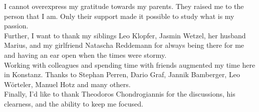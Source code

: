 I cannot overexpress my gratitude towards my parents.
They raised me to the person that I am.
Only their support made it possible to study what is my passion. \\

Further, I want to thank my siblings Leo Klopfer, Jasmin Wetzel, her husband Marius, and my girlfriend Natascha Reddemann for always being there for me and having an ear open when the times were stormy. \\

Working with colleagues and spending time with friends augmented my time here in Konstanz. Thanks to Stephan Perren, Dario Graf, Jannik Bamberger, Leo Wörteler, Manuel Hotz and many others. \\


Finally, I'd like to thank Theodoros Chondrogiannis for the discussions, his clearness, and the ability to keep me focused. 
\vfill\hspace{0pt}
\newpage
